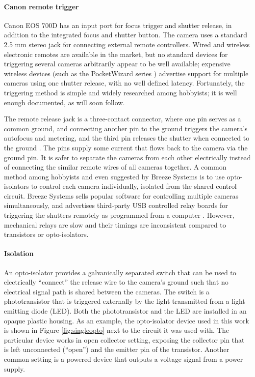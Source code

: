 \paragraph{Canon remote trigger}

Canon EOS 700D has an input port for focus trigger and shutter release, in addition to the integrated focus and shutter button.
The camera uses a standard 2.5 mm stereo jack for connecting external remote controllers.
Wired and wireless electronic remotes are available in the market, but no standard devices for triggering several cameras arbitrarily appear to be well available; expensive wireless devices (such as the PocketWizard series \cite{pocketwizard}) advertise support for multiple cameras using one shutter release, with no well defined latency.
Fortunately, the triggering method is simple and widely researched among hobbyists; it is well enough documented, as will soon follow.

The remote release jack is a three-contact connector, where one pin serves as a common ground, and connecting another pin to the ground triggers the camera's autofocus and metering, and the third pin releases the shutter when connected to the ground \cite{docdiy}.
The pins supply some current that flows back to the camera via the ground pin.
It is safer to separate the cameras from each other electrically instead of connecting the similar remote wires of all cameras together.
A common method among hobbyists and even suggested by Breeze Systems \cite{breezesystemsremote} is to use opto-isolators to control each camera individually, isolated from the shared control circuit.
Breeze Systems sells popular software for controlling multiple cameras simultaneously, and advertises third-party USB controlled relay boards for triggering the shutters remotely as programmed from a computer \cite{breezesystemsremote}.
However, mechanical relays are slow and their timings are inconsistent compared to transistors or opto-isolators.

\paragraph{Isolation}
An opto-isolator provides a galvanically separated switch that can be used to electrically ``connect'' the release wire to the camera's ground such that no electrical signal path is shared between the cameras.
The switch is a phototransistor that is triggered externally by the light transmitted from a light emitting diode (LED).
Both the phototransistor and the LED are installed in an opaque plastic housing.
As an example, the opto-isolator device used in this work is shown in Figure \ref{fig:singleopto} next to the circuit it was used with.
The particular device works in open collector setting, exposing the collector pin that is left unconnected (``open'') and the emitter pin of the transistor.
Another common setting is a powered device that outputs a voltage signal from a power supply.

